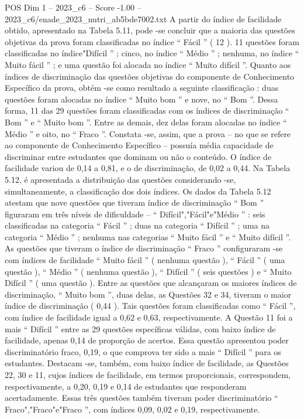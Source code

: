 \begin{textsample}{POS Dim 1 – 2023\_c6 – Score -1.00 – 2023\_c6/enade\_2023\_nutri\_ab5bde7002.txt}
A partir do índice de facilidade obtido, apresentado na Tabela 5.11, pode -se concluir que a maioria das questões objetivas da prova foram classificadas no índice “ Fácil ” ( 12 ). 11 questões foram classificadas no índice"Difícil ” ; cinco, no índice “ Médio ” ; nenhuma, no índice “ Muito fácil ” ; e uma questão foi alocada no índice “ Muito difícil ”.
Quanto aos índices de discriminação das questões objetivas do componente de Conhecimento Específico da prova, obtém -se como resultado a seguinte classificação : duas questões foram alocadas no índice “ Muito bom ” e nove, no “ Bom ”.
Dessa forma, 11 das 29 questões foram classificadas com os índices de discriminação “ Bom ” e “ Muito bom ”.
Entre as demais, dez delas foram alocadas no índice “ Médio ” e oito, no “ Fraco ”.
Constata -se, assim, que a prova – no que se refere ao componente de Conhecimento Específico – possuía média capacidade de discriminar entre estudantes que dominam ou não o conteúdo.
O índice de facilidade variou de 0,14 a 0,81, e o de discriminação, de 0,02 a 0,44.
Na Tabela 5.12, é apresentada a distribuição das questões considerando -se, simultaneamente, a classificação dos dois índices.
Os dados da Tabela 5.12 atestam que nove questões que tiveram índice de discriminação “ Bom ” figuraram em três níveis de dificuldade – “ Difícil","Fácil"e"Médio ” : seis classificadas na categoria “ Fácil ” ; duas na categoria “ Difícil ” ; uma na categoria “ Médio ” ; nenhuma nas categorias “ Muito fácil ” e “ Muito difícil ”.
As questões que tiveram o índice de discriminação “ Fraco ” configuraram -se com índices de facilidade “ Muito fácil ” ( nenhuma questão ), “ Fácil ” ( uma questão ), “ Médio ” ( nenhuma questão ), “ Difícil ” ( seis questões ) e “ Muito Difícil ” ( uma questão ).
Entre as questões que alcançaram os maiores índices de discriminação, “ Muito bom ”, duas delas, as Questões 32 e 34, tiveram o maior índice de discriminação ( 0,44 ).
Tais questões foram classificadas como “ Fácil ”, com índice de facilidade igual a 0,62 e 0,63, respectivamente.
A Questão 11 foi a mais “ Difícil ” entre as 29 questões específicas válidas, com baixo índice de facilidade, apenas 0,14 de proporção de acertos.
Essa questão apresentou poder discriminatório fraco, 0,19, o que comprova ter sido a mais “ Difícil ” para os estudantes.
Destacam -se, também, com baixo índice de facilidade, as Questões 22, 30 e 11, cujos índices de facilidade, em termos proporcionais, correspondem, respectivamente, a 0,20, 0,19 e 0,14 de estudantes que responderam acertadamente.
Essas três questões também tiveram poder discriminatório “ Fraco","Fraco"e"Fraco ”, com índices 0,09, 0,02 e 0,19, respectivamente.

\end{textsample}
